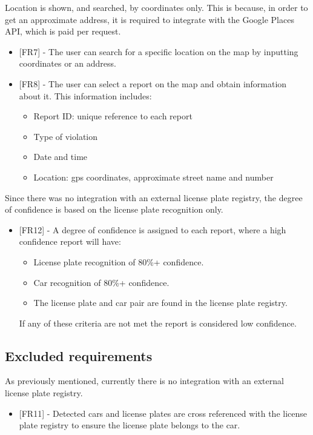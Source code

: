 Location is shown, and searched, by coordinates only. This is because, in order to get an approximate address, it is required to integrate with the Google Places API, which is paid per request.
\begin{itemize}[label={}]

    \item {[FR7]} - The user can search for a specific location on the map by inputting coordinates or an address.
    \item {[FR8]} - The user can select a report on the map and obtain information about it. This information includes:
    \begin{itemize}[label={\textbullet}]
        \item Report ID: unique reference to each report
        \item Type of violation
        \item Date and time
        \item Location: gps coordinates, approximate street name and number
    \end{itemize}
\end{itemize}

\vspace{5mm}
Since there was no integration with an external license plate registry, the degree of confidence is based on the license plate recognition only.
\begin{itemize}[label={}]

            \item {[FR12]} - A degree of confidence is assigned to each report, where a high confidence report will have:
                \begin{itemize}[label={\textbullet}]
                    \item License plate recognition of 80\%+ confidence.
                    \item Car recognition of 80\%+ confidence.
                    \item The license plate and car pair are found in the license plate registry.
                \end{itemize}
            If any of these criteria are not met the report is considered low confidence.

\end{itemize}


\subsection{Excluded requirements}
As previously mentioned, currently there is no integration with an external license plate registry.
\begin{itemize}[label={}]
    \item {[FR11]} - Detected cars and license plates are cross referenced with the license plate registry to ensure the license plate belongs to the car.
\end{itemize}

